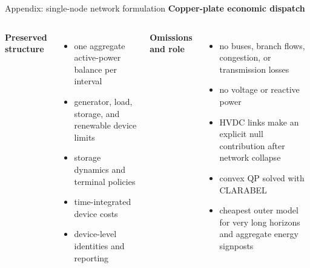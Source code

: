 \documentclass[aspectratio=169,11pt]{beamer}
\newcommand{\tightitems}{\setlength{\itemsep}{0.42em}}
\begin{document}
\begin{frame}{Appendix: single-node network formulation}
  \textbf{Copper-plate economic dispatch}
  \begin{columns}[T,onlytextwidth]
    \textbf{Preserved structure}
    \begin{itemize}\small\tightitems
      \item one aggregate active-power balance per interval
      \item generator, load, storage, and renewable device limits
      \item storage dynamics and terminal policies
      \item time-integrated device costs
      \item device-level identities and reporting
    \end{itemize}
    \textbf{Omissions and role}
    \begin{itemize}\small\tightitems
      \item no buses, branch flows, congestion, or transmission losses
      \item no voltage or reactive power
      \item HVDC links make an explicit null contribution after network collapse
      \item convex QP solved with CLARABEL
      \item cheapest outer model for very long horizons and aggregate energy signposts
    \end{itemize}
  \end{columns}
\end{frame}
\end{document}
